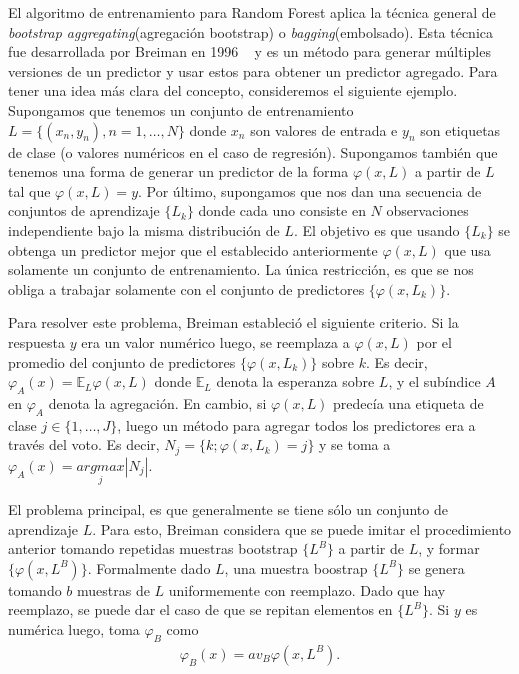 	El algoritmo de entrenamiento para Random Forest aplica la técnica general de \textit{bootstrap aggregating}(agregación bootstrap) o \textit{bagging}(embolsado). Esta técnica fue desarrollada por Breiman en 1996 ~\cite{LBreiman96} y es un método para generar múltiples versiones de un predictor y usar estos para obtener un predictor agregado. Para tener una idea más clara del concepto, consideremos el siguiente ejemplo. Supongamos que tenemos un conjunto de entrenamiento $L = \{ (x_n,y_n), n = 1,\dots, N \}$ donde $x_n$ son valores de entrada e $y_n$ son etiquetas de clase (o valores numéricos en el caso de regresión). Supongamos también que tenemos una forma de generar un predictor de la forma $\varphi(x,L)$ a partir de $L$ tal que $ \varphi(x,L) = y $. Por último, supongamos que nos dan una secuencia de conjuntos de aprendizaje $\{ L_k \}$ donde cada uno consiste en $N$ observaciones independiente bajo la misma distribución de $L$. El objetivo es que usando $\{ L_k \}$ se obtenga un predictor mejor que el establecido anteriormente $\varphi(x,L)$ que usa solamente un conjunto de entrenamiento. La única restricción, es que se nos obliga a trabajar solamente con el conjunto de predictores $\{ \varphi(x, L_k)\} $.

	Para resolver este problema, Breiman estableció el siguiente criterio. Si la respuesta $y$ era un valor numérico luego, se reemplaza a $\varphi(x,L)$ por el promedio del conjunto de predictores $ \{ \varphi(x, L_k) \} $ sobre $k$. Es decir, $\varphi_A(x) = \mathbb{E}_L\varphi(x,L)$ donde $\mathbb{E}_L$ denota la esperanza sobre $L$, y el subíndice $A$ en $\varphi_A$ denota la agregación. En cambio, si $\varphi(x,L)$ predecía una etiqueta de clase $j \in \{ 1,\dots, J \} $, luego un método para agregar todos los predictores era a través del voto. Es decir, $N_j = \{ k;\varphi(x, L_k) = j \}$ y se toma a $\varphi_A(x) = \underset{j}{argmax}|N_j|$.

	El problema principal, es que generalmente se tiene sólo un conjunto de aprendizaje $L$. Para esto, Breiman considera que se puede imitar el procedimiento anterior tomando repetidas muestras bootstrap $\{ L^{B} \}$ a partir de $L$, y formar $\{ \varphi(x, L^{B}) \}$. Formalmente dado $L$, una muestra boostrap $\{ L^{B} \}$ se genera tomando $b$ muestras de $L$ uniformemente con reemplazo. Dado que hay reemplazo, se puede dar el caso de que se repitan elementos en $\{ L^{B} \}$. Si $y$ es numérica luego, toma $\varphi_B$ como
	\begin{align*}
		\varphi_B(x) = av_B\varphi(x,L^{B}).
	\end{align*}

